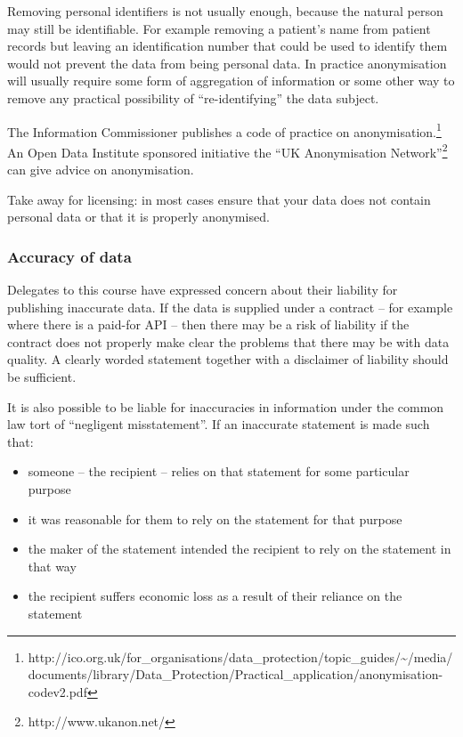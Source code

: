 Removing personal identifiers is not usually enough, because the natural
person may still be identifiable. For example removing a patient's name
from patient records but leaving an identification number that could be
used to identify them would not prevent the data from being personal
data. In practice anonymisation will usually require some form of
aggregation of information or some other way to remove any practical
possibility of ``re-identifying'' the data subject.

The Information Commissioner publishes a code of practice on
anonymisation.\footnote{http://ico.org.uk/for\_organisations/data\_protection/topic\_guides/\textasciitilde{}/media/documents/library/Data\_Protection/Practical\_application/anonymisation-codev2.pdf}
An Open Data Institute sponsored initiative the ``UK Anonymisation
Network''\footnote{http://www.ukanon.net/} can give advice on
anonymisation.

Take away for licensing: in most cases ensure that your data does not
contain personal data or that it is properly anonymised.

\subsubsection{Accuracy of data}\label{accuracy-of-data}

Delegates to this course have expressed concern about their liability
for publishing inaccurate data. If the data is supplied under a contract
-- for example where there is a paid-for API -- then there may be a risk
of liability if the contract does not properly make clear the problems
that there may be with data quality. A clearly worded statement together
with a disclaimer of liability should be sufficient.

It is also possible to be liable for inaccuracies in information under
the common law tort of ``negligent misstatement''. If an inaccurate
statement is made such that:

\begin{itemize}
\item
  someone -- the recipient -- relies on that statement for some
  particular purpose
\item
  it was reasonable for them to rely on the statement for that purpose
\item
  the maker of the statement intended the recipient to rely on the
  statement in that way
\item
  the recipient suffers economic loss as a result of their reliance on
  the statement
\end{itemize}

